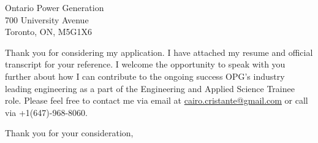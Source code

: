\documentclass[11pt]{FDUletter}
\begin{document}
\begin{letter}{
    Ontario Power Generation \\
    700 University Avenue\\
    Toronto, ON, M5G1X6 \\
}




Thank you for considering my application. I have attached my resume and official transcript for your reference. I welcome the opportunity to speak with you further about how I can contribute to the ongoing success OPG's industry leading engineering as a part of the Engineering and Applied Science Trainee role. Please feel free to contact me via email at \href{mailto:cairo.cristante@gmail.com}{cairo.cristante@gmail.com} or call via +1(647)-968-8060.


\closing{Thank you for your consideration,}




% 
% 

\end{letter}
\end{document}
